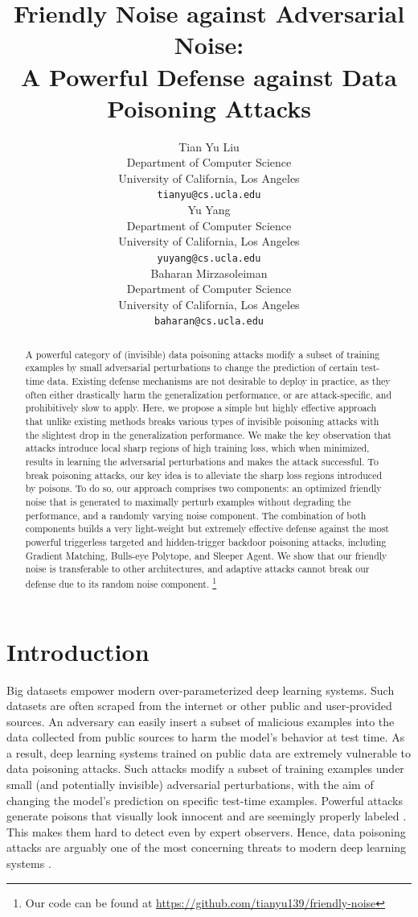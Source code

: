 \documentclass{article}
\title{
{Friendly Noise against Adversarial Noise:\\ A Powerful Defense against Data Poisoning Attacks}}
\author{%
  Tian Yu Liu \\
  Department of Computer Science\\
  University of California, Los Angeles\\
  \texttt{tianyu@cs.ucla.edu} \\
   \And
  Yu Yang \\
  Department of Computer Science\\
  University of California, Los Angeles\\
  \texttt{yuyang@cs.ucla.edu} \\
   \And
  Baharan Mirzasoleiman \\
  Department of Computer Science\\
  University of California, Los Angeles\\
  \texttt{baharan@cs.ucla.edu} \\ 
}
\begin{document}
\maketitle


\begin{abstract}
A powerful category of (invisible) data poisoning attacks modify a subset of training examples by small adversarial perturbations to change the prediction of certain test-time data. 
Existing defense mechanisms are not desirable to deploy in practice, as they often
either drastically harm the generalization performance, or are attack-specific, %
and prohibitively slow to apply. %
Here, we propose a simple but highly effective approach that unlike existing methods breaks various types of invisible poisoning attacks with the slightest drop in the generalization performance. 
We make the key observation that attacks introduce %
local sharp regions of high training loss, %
which when minimized, results in learning the adversarial perturbations and makes the attack successful.
To break poisoning attacks, our key idea is to alleviate the sharp loss regions introduced by poisons. %
To do so, our approach comprises two components: an optimized friendly noise that is generated to maximally perturb examples without degrading the performance, and a randomly varying noise component.
The combination of both components builds a very light-weight but extremely effective defense against the most powerful triggerless targeted and hidden-trigger backdoor poisoning attacks, including Gradient Matching, Bulls-eye Polytope, and Sleeper Agent. We show that our friendly noise is transferable to other architectures, and adaptive attacks cannot break our defense due to its random noise component. \footnote{Our code can be found at \href{https://github.com/tianyu139/friendly-noise}{https://github.com/tianyu139/friendly-noise}}
\end{abstract}


\section{Introduction}
Big datasets empower modern over-parameterized deep learning systems. 
Such datasets are often scraped from the internet or other public and user-provided sources.
An adversary can easily insert a subset of malicious examples into the data collected from public sources to harm the model's behavior at test time. 
As a result, deep learning systems trained on public data are extremely vulnerable to data poisoning attacks. Such attacks modify a subset of training examples under small (and potentially invisible) adversarial perturbations, with the aim of changing the model's prediction on specific test-time examples. Powerful attacks generate poisons that visually look innocent and are seemingly properly labeled
\citep{geiping2020witches,huang2020metapoison,souri2021sleeper}. This makes them hard to detect {even} by expert observers.
Hence, data poisoning attacks are arguably one of the most concerning threats to modern deep learning systems \citep{ShankarAML}.
\end{document}
